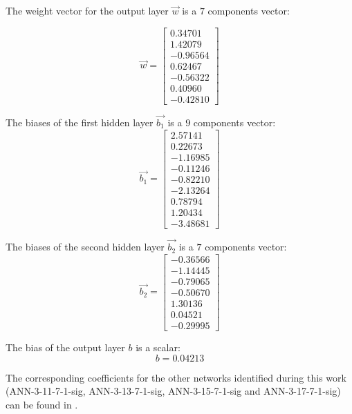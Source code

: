 \documentclass[preprint,12pt,times]{elsarticle}
\begin{document}
The weight vector for the output layer $\overrightarrow{w}$ is a $7$ components vector:

\begin{equation*}
\overrightarrow{w}=\left[
\begin{array}{r}
  0.34701\\
  1.42079\\
 -0.96564\\
  0.62467\\
 -0.56322\\
  0.40960\\
 -0.42810
\end{array}\right]
\end{equation*}

The biases of the first hidden layer $\overrightarrow{b_1}$ is a $9$ components vector:
\begin{equation*}
\overrightarrow{b_1}=\left[
\begin{array}{r}
  2.57141\\
  0.22673\\
 -1.16985\\
 -0.11246\\
 -0.82210\\
 -2.13264\\
  0.78794\\
  1.20434\\
 -3.48681
\end{array}\right]
\end{equation*}

The biases of the second hidden layer $\overrightarrow{b_2}$ is a $7$ components vector:
\begin{equation*}
\overrightarrow{b_2}=\left[
\begin{array}{r}
 -0.36566\\
 -1.14445\\
 -0.79065\\
 -0.50670\\
  1.30136\\
  0.04521\\
 -0.29995
\end{array}\right]
\end{equation*}

The bias of the output layer $b$ is a scalar:
\begin{equation*}
b=0.04213
\end{equation*}

The corresponding coefficients for the other networks identified during this work (ANN-3-11-7-1-sig, ANN-3-13-7-1-sig, ANN-3-15-7-1-sig and ANN-3-17-7-1-sig) can be found in \cite{pantale_Coefficients_2022}.

%
\end{document}
